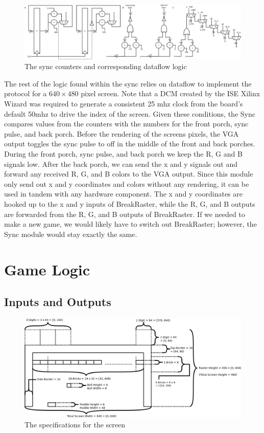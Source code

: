 \documentclass[conference]{IEEEtran}
\begin{document}
\begin{figure}[!t]
\centering
\includegraphics[width=7in]{Sync}
\caption{The sync counters and corresponding dataflow logic}
\label{Sync}
\end{figure}

The rest of the logic found within the sync relies on dataflow to implement the protocol for a $640 \times 480$ pixel screen. Note that a DCM created by the ISE Xilinx Wizard was required to generate a consistent 25 mhz clock from the board's default 50mhz to drive the index of the screen. Given these conditions, the Sync compares values from the counters with the numbers for the front porch, sync pulse, and back porch. Before the rendering of the screens pixels, the VGA output toggles the sync pulse to off in the middle of the front and back porches. During the front porch, sync pulse, and back porch we keep the R, G and B signals low. After the back porch, we can send the x and y signals out and forward any received R, G, and B colors to the VGA output. Since this module only send out x and y coordinates and colors without any rendering, it can be used in tandem with any hardware component. The x and y coordinates are hooked up to the x and y inputs of BreakRaster, while the R, G, and B outputs are forwarded from the R, G, and B outputs of BreakRaster. If we needed to make a new game, we would likely have to switch out BreakRaster; however, the Sync module would stay exactly the same.

\section{Game Logic}

\subsection{Inputs and Outputs}

\begin{figure}[!t]
\centering
\includegraphics[width=7in]{Screen}
\caption{The specifications for the screen}
\label{Screen}
\end{figure}
\end{document}
